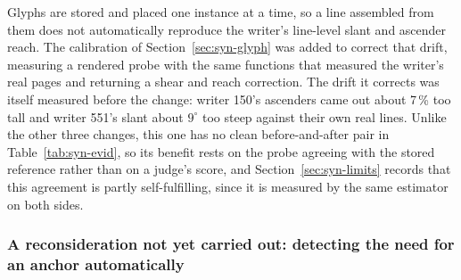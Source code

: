 Glyphs are stored and placed one instance at a time, so a line assembled from them does not automatically reproduce the writer's line-level slant and ascender reach. The calibration of Section~\ref{sec:syn-glyph} was added to correct that drift, measuring a rendered probe with the same functions that measured the writer's real pages and returning a shear and reach correction. The drift it corrects was itself measured before the change: writer 150's ascenders came out about 7\,\% too tall and writer 551's slant about $9^\circ$ too steep against their own real lines. Unlike the other three changes, this one has no clean before-and-after pair in Table~\ref{tab:syn-evid}, so its benefit rests on the probe agreeing with the stored reference rather than on a judge's score, and Section~\ref{sec:syn-limits} records that this agreement is partly self-fulfilling, since it is measured by the same estimator on both sides.

\subsubsection{A reconsideration not yet carried out: detecting the need for an anchor automatically}

